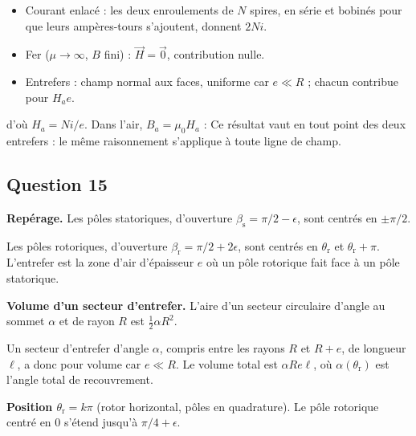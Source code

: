 \documentclass[11pt,a4paper]{article}
\providecommand{\tightlist}{\setlength{\itemsep}{0pt}\setlength{\parskip}{0pt}}
\newcommand{\equationajustee}[1]{%
  \sbox{\boiteequation}{$\displaystyle #1$}%
  \ifdim\wd\boiteequation>\linewidth
    \[\resizebox{\linewidth}{!}{\usebox{\boiteequation}}\]%
  \else
    \[#1\]%
  \fi}
\begin{document}
\begin{itemize}
\tightlist
\item
  Courant enlacé : les deux enroulements de \(N\) spires, en série et bobinés pour que leurs ampères-tours s'ajoutent, donnent \(2Ni\).
\item
  Fer (\(\mu\to\infty\), \(B\) fini) : \(\vec H=\vec 0\), contribution nulle.
\item
  Entrefers : champ normal aux faces, uniforme car \(e\ll R\) ; chacun contribue pour \(H_ae\).
\end{itemize}

\equationajustee{\begin{aligned}
\oint\vec H\cdot\mathrm d\vec\ell&=2H_ae\\
&=2Ni
\end{aligned}}
d'où \(H_a=Ni/e\). Dans l'air, \(B_a=\mu_0H_a\) :
\equationajustee{\boxed{B_a=\frac{\mu_0Ni}{e}}}
Ce résultat vaut en tout point des deux entrefers : le même raisonnement s'applique à toute ligne de champ.

\hypertarget{question-15}{%
\subsection{Question 15}\label{question-15}}

\textbf{Repérage.} Les pôles statoriques, d'ouverture \(\beta_{\mathrm s}=\pi/2-\epsilon\), sont centrés en \(\pm\pi/2\).

Les pôles rotoriques, d'ouverture \(\beta_{\mathrm r}=\pi/2+2\epsilon\), sont centrés en \(\theta_{\mathrm r}\) et \(\theta_{\mathrm r}+\pi\). L'entrefer est la zone d'air d'épaisseur \(e\) où un pôle rotorique fait face à un pôle statorique.

\textbf{Volume d'un secteur d'entrefer.} L'aire d'un secteur circulaire d'angle au sommet \(\alpha\) et de rayon \(R\) est \(\tfrac12\alpha R^2\).

Un secteur d'entrefer d'angle \(\alpha\), compris entre les rayons \(R\) et \(R+e\), de longueur \(\ell\), a donc pour volume
\equationajustee{\begin{aligned}
V&=\frac{\alpha}{2}\big[(R+e)^2-R^2\big]\ell\\
&\simeq\alpha\,Re\ell
\end{aligned}}
car \(e\ll R\). Le volume total est \(\alpha Re\ell\), où \(\alpha(\theta_{\mathrm r})\) est l'angle total de recouvrement.

\textbf{Position \(\theta_{\mathrm r}=k\pi\)} (rotor horizontal, pôles en quadrature). Le pôle rotorique centré en \(0\) s'étend jusqu'à \(\pi/4+\epsilon\).
\end{document}
